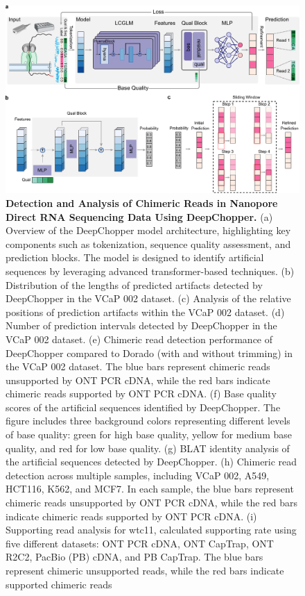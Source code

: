 \documentclass[pdflatex, sn-mathphys-num, lineno]{sn-jnl}%
\newcommand{\chopper}{DeepChopper\xspace}
\theoremstyle{thmstyleone}%
\theoremstyle{thmstyletwo}%
\theoremstyle{thmstylethree}%
\begin{document}
\begin{figure}[!h]
	\includegraphics[height=0.78\columnwidth]{figures/finals/figure1}
    \caption{{\bf  Detection and Analysis of Chimeric Reads in Nanopore Direct RNA Sequencing Data Using \chopper.} (a) Overview of the \chopper model architecture, highlighting key components such as tokenization, sequence quality assessment, and prediction blocks. The model is designed to identify artificial sequences by leveraging advanced transformer-based techniques. (b) Distribution of the lengths of predicted artifacts detected by DeepChopper in the VCaP 002 dataset. (c) Analysis of the relative positions of prediction artifacts within the VCaP 002 dataset.  (d) Number of prediction intervals detected by DeepChopper in the VCaP 002 dataset. (e) Chimeric read detection performance of DeepChopper compared to Dorado (with and without trimming) in the VCaP 002 dataset. The blue bars represent chimeric reads unsupported by ONT PCR cDNA, while the red bars indicate chimeric reads supported by ONT PCR cDNA.  (f) Base quality scores of the artificial sequences identified by DeepChopper. The figure includes three background colors representing different levels of base quality: green for high base quality, yellow for medium base quality, and red for low base quality. (g) BLAT identity analysis of the artificial sequences detected by DeepChopper. (h) Chimeric read detection across multiple samples, including VCaP 002, A549, HCT116, K562, and MCF7. In each sample, the blue bars represent chimeric reads unsupported by ONT PCR cDNA, while the red bars indicate chimeric reads supported by ONT PCR cDNA. (i)  Supporting read analysis for wtc11, calculated supporting rate using five different datasets: ONT PCR cDNA, ONT CapTrap, ONT R2C2, PacBio (PB) cDNA, and PB CapTrap. The blue bars represent chimeric unsupported reads, while the red bars indicate  supported chimeric reads}
	\label{fig:f1}
\end{figure}
\end{document}
